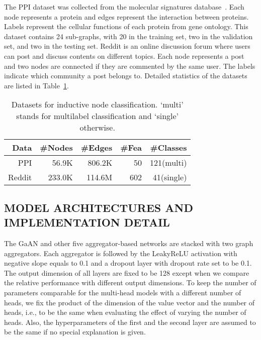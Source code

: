 \documentclass{article}
\begin{document}
	
	The PPI dataset was collected from the molecular signatures database~\citep{subramanian2005gene}. Each node represents a protein and edges represent the interaction between proteins. Labels represent the cellular functions of each protein from gene ontology. This dataset contains 24 sub-graphs, with 20 in the training set, two in the validation set, and two in the testing set. 
	Reddit is an online discussion forum where users can post and discuss contents on different topics. Each node represents a post and two nodes are connected if they are commented by the same user. 
	The labels indicate which community a post belongs to. Detailed statistics of the datasets are listed in Table~\ref{table:nc_dataset}.
	
	\begin{table}[!tb]
		\centering
		\caption{Datasets for inductive node classification. `multi' stands for multilabel classification and `single' otherwise.}
		\vskip -0.1in
		\begin{tabular}{r  rrrr }
			\hline
			\textbf{Data}  & \#\textbf{Nodes} & \#\textbf{Edges} & \#\textbf{Fea} & \#\textbf{Classes} \\
			\hline \hline
			PPI       & 56.9K  & 806.2K   & 50  & 121(multi)  \\  Reddit    & 233.0K & 114.6M & 602 & 41(single)   \\ \hline \end{tabular}
		\label{table:nc_dataset}
\end{table}
	
	\subsection{MODEL ARCHITECTURES AND IMPLEMENTATION DETAIL}
	The GaAN and other five aggregator-based networks are stacked with two graph aggregators. Each aggregator is followed by the LeakyReLU activation with negative slope equals to 0.1 and a dropout layer with dropout rate set to be 0.1. The output dimension  of all layers are fixed to be 128 except when we compare the relative performance with different output dimensions. To keep the number of parameters comparable for the multi-head models with a different number of heads, we fix the product of the dimension of the value vector and the number of heads, i.e.,  to be the same when evaluating the effect of varying the number of heads. Also, the hyperparameters of the first and the second layer are assumed to be the same if no special explanation is given.
\end{document}
